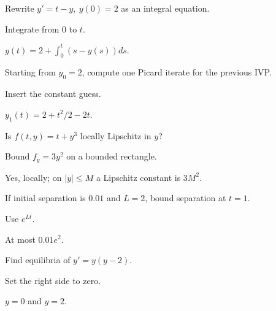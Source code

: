 \begin{exercise}\label{exr:ii19-expand-01}
Rewrite \(y'=t-y,\ y(0)=2\) as an integral equation.
\end{exercise}
\begin{hint}
Integrate from \(0\) to \(t\).
\end{hint}
\begin{solution}
\(y(t)=2+\int_0^t(s-y(s))ds\).
\end{solution}

\begin{exercise}\label{exr:ii19-expand-02}
Starting from \(y_0=2\), compute one Picard iterate for the previous IVP.
\end{exercise}
\begin{hint}
Insert the constant guess.
\end{hint}
\begin{solution}
\(y_1(t)=2+t^2/2-2t\).
\end{solution}

\begin{exercise}\label{exr:ii19-expand-03}
Is \(f(t,y)=t+y^3\) locally Lipschitz in \(y\)?
\end{exercise}
\begin{hint}
Bound \(f_y=3y^2\) on a bounded rectangle.
\end{hint}
\begin{solution}
Yes, locally; on \(|y|\le M\) a Lipschitz constant is \(3M^2\).
\end{solution}

\begin{exercise}\label{exr:ii19-expand-04}
If initial separation is \(0.01\) and \(L=2\), bound separation at \(t=1\).
\end{exercise}
\begin{hint}
Use \(e^{Lt}\).
\end{hint}
\begin{solution}
At most \(0.01e^2\).
\end{solution}

\begin{exercise}[Equilibria]\label{exr:ii19-expand-05}
Find equilibria of \(y'=y(y-2)\).
\end{exercise}
\begin{hint}
Set the right side to zero.
\end{hint}
\begin{solution}
\(y=0\) and \(y=2\).
\end{solution}

